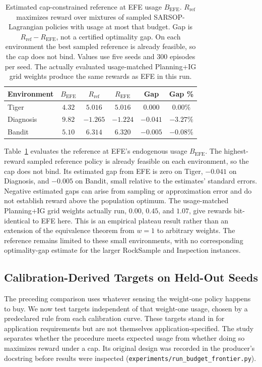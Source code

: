 \begin{table}[h]
\centering
\caption{Estimated cap-constrained reference at EFE usage $B_{\mathrm{EFE}}$. $R_{\mathrm{ref}}$ maximizes reward over mixtures of sampled SARSOP-Lagrangian policies with usage at most that budget. Gap is $R_{\mathrm{ref}}-R_{\mathrm{EFE}}$, not a certified optimality gap. On each environment the best sampled reference is already feasible, so the cap does not bind. Values use five seeds and $300$ episodes per seed. The actually evaluated usage-matched Planning+IG grid weights produce the same rewards as EFE in this run.}
\label{tab:cpomdp}
\tablefontsize
\begin{tabular}{lccccc}
\toprule
Environment & $B_{\mathrm{EFE}}$ & $R_{\mathrm{ref}}$ & $R_{\mathrm{EFE}}$ & Gap & Gap \% \\
\midrule
Tiger & $4.32$ & $5.016$ & $5.016$ & $0.000$ & $0.00\%$ \\
Diagnosis & $9.82$ & $-1.265$ & $-1.224$ & $-0.041$ & $-3.27\%$ \\
Bandit & $5.10$ & $6.314$ & $6.320$ & $-0.005$ & $-0.08\%$ \\
\bottomrule
\end{tabular}
\end{table}

Table~\ref{tab:cpomdp} evaluates the reference at EFE's endogenous usage $B_{\mathrm{EFE}}$. The highest-reward sampled reference policy is already feasible on each environment, so the cap does not bind. Its estimated gap from EFE is zero on Tiger, $-0.041$ on Diagnosis, and $-0.005$ on Bandit, small relative to the estimates' standard errors. Negative estimated gaps can arise from sampling or approximation error and do not establish reward above the population optimum. The usage-matched Planning+IG grid weights actually run, $0.00$, $0.45$, and $1.07$, give rewards bit-identical to EFE here. This is an empirical plateau result rather than an extension of the equivalence theorem from $w{=}1$ to arbitrary weights. The reference remains limited to these small environments, with no corresponding optimality-gap estimate for the larger RockSample and Inspection instances.

\subsection{Calibration-Derived Targets on Held-Out Seeds}
\label{sec:budget_frontier}

The preceding comparison uses whatever sensing the weight-one policy happens to buy. We now test targets independent of that weight-one usage, chosen by a predeclared rule from each calibration curve. These targets stand in for application requirements but are not themselves application-specified. The study separates whether the procedure meets expected usage from whether doing so maximizes reward under a cap. Its original design was recorded in the producer's docstring before results were inspected (\texttt{experiments/\allowbreak run\_\allowbreak budget\_\allowbreak frontier.py}).

